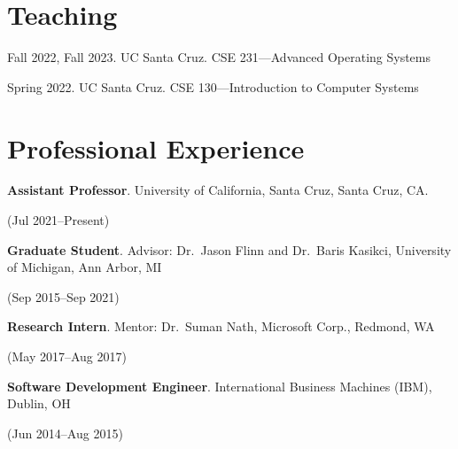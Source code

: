 \documentclass[letterpaper,10pt]{article}
\newcommand{\sidebyside}[2]{
  \begin{minipage}[t]{.75\textwidth}
    \raggedright{}
    #2
  \end{minipage}
  \hspace{.01\textwidth}
    \begin{minipage}[t]{.205\textwidth}
    \raggedleft
    #1
  \end{minipage}
}
\newcommand{\trio}[3]{\sidebyside{#3}{\textbf{#1}. #2}}
\begin{document}



\section{Teaching}
\begin{smenumerate}
\item Fall 2022, Fall 2023. UC Santa Cruz. CSE 231---Advanced Operating Systems
\item Spring 2022. UC Santa Cruz. CSE 130---Introduction to Computer Systems
\end{smenumerate}

\section{Professional Experience}
\begin{smenumerate}
\item\trio{Assistant Professor}{ University of California, Santa Cruz, Santa Cruz, CA.}{(Jul 2021--Present)}
\item\trio{Graduate Student}{Advisor: Dr.\ Jason Flinn and Dr.\ Baris Kasikci,
  University of Michigan, Ann Arbor, MI}{(Sep 2015--Sep 2021)}
\item\trio{Research Intern}{Mentor: Dr.\ Suman Nath, Microsoft Corp.,
  Redmond, WA}{(May 2017--Aug 2017)}
\item\trio{Software Development Engineer}{International Business Machines (IBM),
  Dublin, OH}{(Jun 2014--Aug 2015)}
\end{smenumerate}
\end{document}
